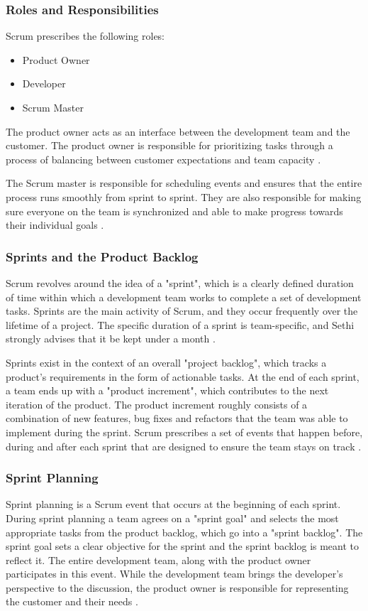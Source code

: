 \documentclass[11pt]{article}
\begin{document}
        \subsubsection{Roles and Responsibilities}
        Scrum prescribes the following roles:
        \begin{itemize}
            \item Product Owner
            \item Developer
            \item Scrum Master
        \end{itemize}

        The product owner acts as an interface between the development team and the customer. The product owner is responsible for prioritizing tasks through a process of balancing between customer expectations and team capacity \citet {sethi}.

        The Scrum master is responsible for scheduling events and ensures that the entire process runs smoothly from sprint to sprint. They are also responsible for making sure everyone on the team is synchronized and able to make progress towards their individual goals \citet{sethi}.
 
        \subsubsection{Sprints and the Product Backlog}
        Scrum revolves around the idea of a "sprint", which is a clearly defined duration of time within which a development team works to complete a set of development tasks. Sprints are the main activity of Scrum, and they occur frequently over the lifetime of a project. The specific duration of a sprint is team-specific, and Sethi strongly advises that it be kept under a month \citet{sethi}.

        Sprints exist in the context of an overall "project backlog", which tracks a product's requirements in the form of actionable tasks. At the end of each sprint, a team ends up with a "product increment", which contributes to the next iteration of the product. The product increment roughly consists of a combination of new features, bug fixes and refactors that the team was able to implement during the sprint. Scrum prescribes a set of events that happen before, during and after each sprint that are designed to ensure the team stays on track \citet{sethi}.

        \subsubsection{Sprint Planning}        
        Sprint planning is a Scrum event that occurs at the beginning of each sprint. During sprint planning a team agrees on a "sprint goal" and selects the most appropriate tasks from the product backlog, which go into a "sprint backlog". The sprint goal sets a clear objective for the sprint and the sprint backlog is meant to reflect it. The entire development team, along with the product owner participates in this event. While the development team brings the developer's perspective to the discussion, the product owner is responsible for representing the customer and their needs \citet{sethi}.
\end{document}
